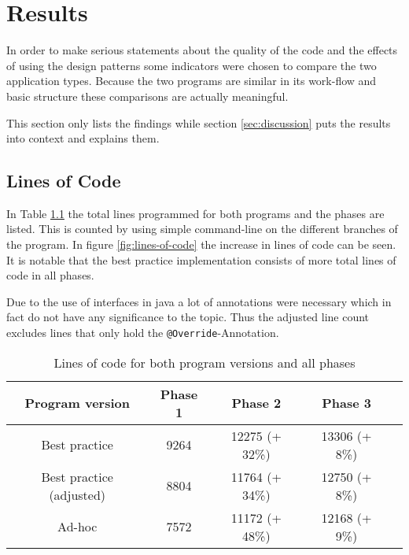 \chapter{Results}
\label{sec:results}
In order to make serious statements about the quality of the code and the effects of using the design patterns some indicators were chosen to compare the two application types. Because the two programs are similar in its work-flow and basic structure these comparisons are actually meaningful.

This section only lists the findings while section \ref{sec:discussion} puts the results into context and explains them.

\section{Lines of Code}
\label{sec:line-count}
In Table \ref{table:lines-of-code} the total lines programmed for both programs and the phases are listed. This is counted by using simple command-line on the different branches of the program. In figure \ref{fig:lines-of-code} the  increase in lines of code can be seen. It is notable that the best practice implementation consists of more total lines of code in all phases. 

Due to the use of interfaces in java a lot of annotations were necessary which in fact do not have any significance to the topic. Thus the adjusted line count excludes lines that only hold the \texttt{@Override}-Annotation.

\begin{table}[htbp]
	\centering

	\begin{tabular}{|c|c|c|c|c|} \hline
	\textbf{Program version} &\textbf{Phase 1} & \textbf{Phase 2} & \textbf{Phase 3} \\ \hline
	Best practice & 9264 & 12275 (+ 32\%)& 13306 (+ 8\%)\\ \hline
	Best practice (adjusted) & 8804 & 11764 (+ 34\%)& 12750 (+ 8\%)\\ \hline
	Ad-hoc & 7572 & 11172 (+ 48\%)& 12168 (+ 9\%)\\ \hline
	\end{tabular}
	\caption{Lines of code for both program versions and all phases}
	\label{table:lines-of-code}
\end{table}

